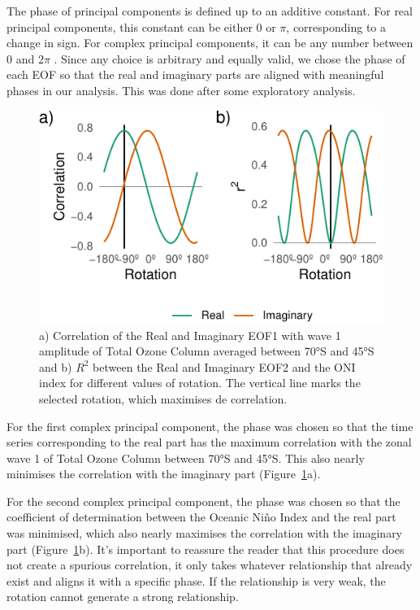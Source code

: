 \documentclass[smallextended]{svjour3}       %
\begin{document}
The phase of principal components is defined up to an additive constant. For real principal components, this constant can be either 0 or \(\pi\), corresponding to a change in sign. For complex principal components, it can be any number between 0 and \(2\pi\) \citep{horel1984}. Since any choice is arbitrary and equally valid, we chose the phase of each EOF so that the real and imaginary parts are aligned with meaningful phases in our analysis. This was done after some exploratory analysis.



\begin{figure}
\centering
\includegraphics{../figures/rotations-1.pdf}
\caption{\label{fig:rotations}a) Correlation of the Real and Imaginary EOF1 with wave 1 amplitude of Total Ozone Column averaged between 70°S and 45°S and b) \(R^2\) between the Real and Imaginary EOF2 and the ONI index for different values of rotation. The vertical line marks the selected rotation, which maximises de correlation.}
\end{figure}

For the first complex principal component, the phase was chosen so that the time series corresponding to the real part has the maximum correlation with the zonal wave 1 of Total Ozone Column between 70°S and 45°S. This also nearly minimises the correlation with the imaginary part (Figure~\ref{fig:rotations}a).

For the second complex principal component, the phase was chosen so that the coefficient of determination between the Oceanic Niño Index \citep{bamston1997} and the real part was minimised, which also nearly maximises the correlation with the imaginary part (Figure~\ref{fig:rotations}b). It's important to reassure the reader that this procedure does not create a spurious correlation, it only takes whatever relationship that already exist and aligns it with a specific phase. If the relationship is very weak, the rotation cannot generate a strong relationship.
\end{document}
